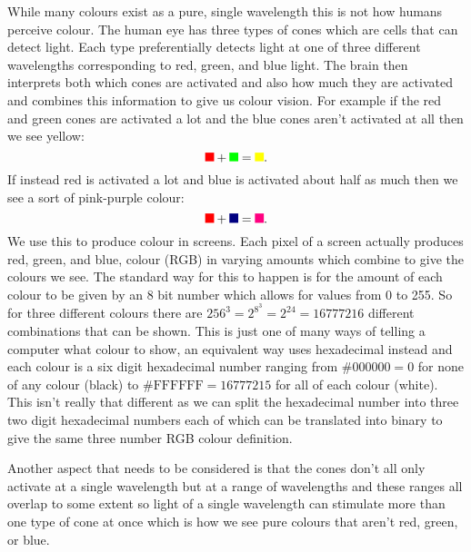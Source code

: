     While many colours exist as a pure, single wavelength this is not how humans perceive colour.
    The human eye has three types of cones which are cells that can detect light.
    Each type preferentially detects light at one of three different wavelengths corresponding to red, green, and blue light.
    The brain then interprets both which cones are activated and also how much they are activated and combines this information to give us colour vision.
    For example if the red and green cones are activated a lot and the blue cones aren't activated at all then we see yellow:
    \tikzexternaldisable
    \[\tikz{\fill[fill=r] (0, 0) rectangle (0.25, 0.25);} + \tikz{\fill[fill=g] (0, 0) rectangle (0.25, 0.25);} = \tikz{\fill[fill=rg] (0, 0) rectangle (0.25, 0.25);}.\]
    \tikzexternalenable
    If instead red is activated a lot and blue is activated about half as much then we see a sort of pink-purple colour:
    \tikzexternaldisable
    \[\tikz{\fill[fill=r] (0, 0) rectangle (0.25, 0.25);} + \tikz{\fill[fill=b] (0, 0) rectangle (0.25, 0.25);} = \tikz{\fill[fill=rb] (0, 0) rectangle (0.25, 0.25);}.\]
    \tikzexternalenable
    We use this to produce colour in screens.
    Each pixel of a screen actually produces red, green, and blue, colour (RGB) in varying amounts which combine to give the colours we see.
    The standard way for this to happen is for the amount of each colour to be given by an 8 bit number which allows for values from 0 to 255.
    So for three different colours there are \(256^3 = 2^{8^3} = 2^{24} = 16777216\) different combinations that can be shown.
    This is just one of many ways of telling a computer what colour to show, an equivalent way uses hexadecimal instead and each colour is a six digit hexadecimal number ranging from \(\mathrm{\#000000} = 0\) for none of any colour (black) to \(\mathrm{\# FFFFFF} = 16777215\) for all of each colour (white).
    This isn't really that different as we can split the hexadecimal number into three two digit hexadecimal numbers each of which can be translated into binary to give the same three number RGB colour definition.
    
    Another aspect that needs to be considered is that the cones don't all only activate at a single wavelength but at a range of wavelengths and these ranges all overlap to some extent so light of a single wavelength can stimulate more than one type of cone at once which is how we see pure colours that aren't red, green, or blue.
    
